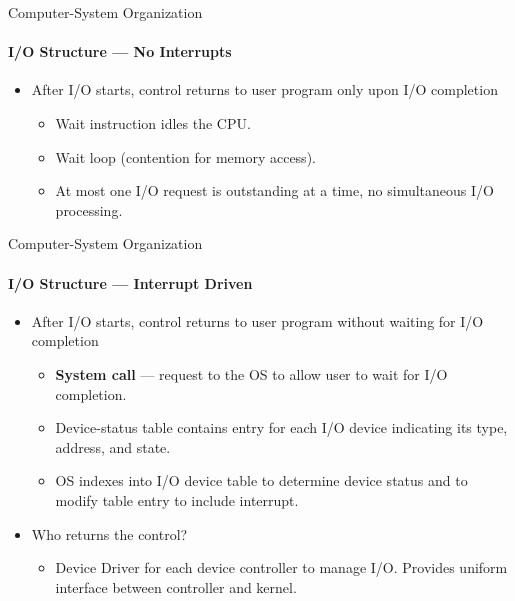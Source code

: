 \documentclass[10pt]{beamer}
\begin{document}

\begin{frame}{Computer-System Organization}
\framesubtitle{I/O Structure --- No Interrupts}
\begin{itemize}
\item After I/O starts, control returns to user program only upon I/O completion
\begin{itemize}
\item Wait instruction idles the CPU.
\item Wait loop (contention for memory access).
\item At most one I/O request is outstanding at a time, no simultaneous I/O processing.
\end{itemize}
\end{itemize}
\end{frame}

\begin{frame}{Computer-System Organization}
\framesubtitle{I/O Structure --- Interrupt Driven}
\begin{itemize}
\item After I/O starts, control returns to user program without waiting for I/O completion
\begin{itemize}
\item \textbf{\alert{System call}} --- request to the OS to allow user to wait for I/O completion.
\item \alert{Device-status table} contains entry for each I/O device indicating its type, address, and state.
\item OS indexes into I/O device table to determine device status and to modify table entry to include interrupt.
\end{itemize}
\item Who returns the control?
\begin{itemize}
\item \alert{Device Driver} for each device controller to manage I/O. Provides uniform interface between controller and kernel.
\end{itemize}
\end{itemize}
\end{frame}
\end{document}
